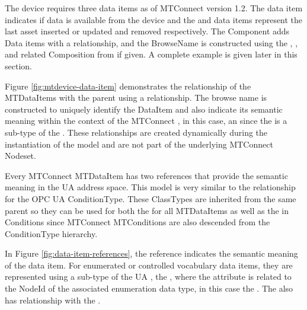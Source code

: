 The device requires three data items as of MTConnect version 1.2. The  data item indicates if data is available from the device and the  and  data items represent the last asset inserted or updated and removed respectively. The Component adds Data items with a  relationship, and the BrowseName is constructed using the , , and related \gls{Composition} from  if given. A complete example is given later in this section.



Figure \ref{fig:mtdevice-data-item} demonstrates the relationship of the \glspl{MTDataItem} with the parent  using a  relationship. The browse name is constructed to uniquely identify the DataItem and also indicate its semantic meaning within the context of the MTConnect , in this case, an  since the  is a sub-type of the . These relationships are created dynamically during the instantiation of the model and are not part of the underlying MTConnect Nodeset.

Every MTConnect \gls{MTDataItem} has two references that provide the semantic meaning in the UA address space. This model is very similar to the  relationship for the OPC UA \gls{ConditionType}. These \glspl{ClassType} are inherited from the same parent so they can be used for both the  for all \glspl{MTDataItem} as well as the  in \glspl{Condition} since MTConnect \glspl{MTCondition} are also descended from the \gls{ConditionType} hierarchy.



In Figure \ref{fig:data-item-references}, the  reference indicates the semantic meaning of the data item. For enumerated or controlled vocabulary data items, they are represented using a sub-type of the UA , the , where the  attribute is related to the NodeId of the associated enumeration data type, in this case the . The  also has  relationship with the  .

